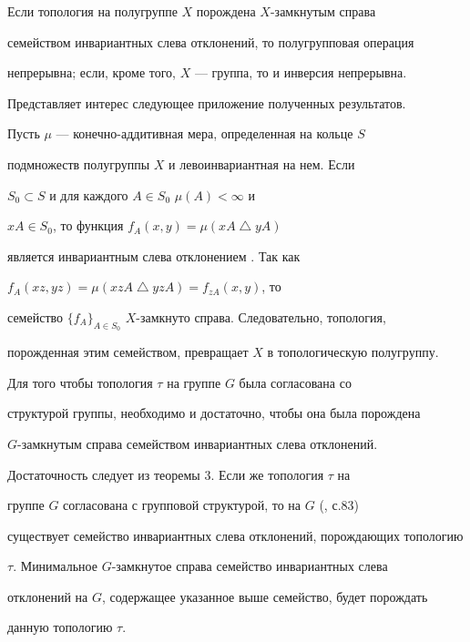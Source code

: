  


\begin{cor} Если топология на полугруппе $X$ порождена $X$-замкнутым справа 


семейством инвариантных слева отклонений, то полугрупповая операция 


непрерывна; если, кроме того, $X$ --- группа, то и инверсия непрерывна. 


\end{cor} 


 


Представляет интерес следующее приложение полученных результатов. 


Пусть $\mu$ --- конечно-аддитивная мера, определенная на кольце $S$ 


подмножеств полугруппы $X$ и левоинвариантная на нем. Если 


$S_0\subset S$ и для каждого $A\in S_0$ $\mu(A)<\infty$ и 


$xA\in S_0$, то функция $f_A(x,y)=\mu(xA\bigtriangleup yA)$ 


является инвариантным слева отклонением \cite{Mu}. Так как 


$f_A(xz,yz)=\mu(xzA\bigtriangleup yzA)=f_{zA}(x,y)$, то 


семейство $\{f_A\}_{A\in S_0}$ $X$-замкнуто справа. Следовательно, топология, 


порожденная этим семейством, превращает $X$ в топологическую полугруппу. 


 


\begin{thm} Для того чтобы топология $\tau$ на группе $G$ была согласована со 


структурой группы, необходимо и достаточно, чтобы она была порождена 


$G$-замкнутым справа семейством инвариантных слева отклонений. 


\end{thm} 


 


\begin{pf} Достаточность следует из теоремы 3. Если же топология $\tau$ на 


группе $G$ согласована с групповой структурой, то на $G$ (\cite{Bur}, с.83) 


существует семейство инвариантных слева отклонений, порождающих топологию 


$\tau$. Минимальное $G$-замкнутое справа семейство инвариантных слева 


отклонений на $G$, содержащее указанное выше семейство, будет порождать 


данную топологию $\tau$.


\end{pf} 


